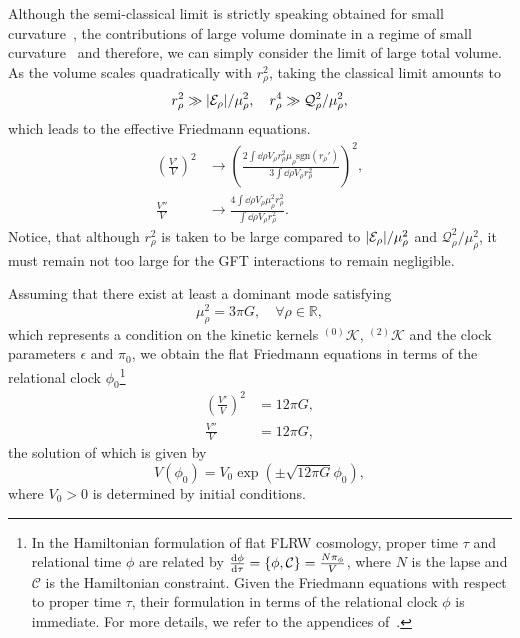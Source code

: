 \documentclass[11pt,a4paper]{article}
\newcommand{\R}{\mathbb R}
\begin{document}
 Although the semi-classical limit is strictly speaking obtained for small curvature~\cite{Oriti:2016qtz,Gielen:2016dss,Ashtekar:2021kfp}, the contributions of large volume dominate in a regime of small curvature~\cite{Oriti:2016qtz} and therefore, we can simply consider the limit of large total volume. As the volume scales quadratically with $r_{\rho}^2$, taking the classical limit amounts to
%
\begin{equation}\label{eq:conditions of classical limit}
r_{\rho}^2 \gg  \abs{\mathcal{E}_{\rho}}/\mu_{\rho}^2,\quad r_{\rho}^4 \gg \mathcal{Q}_{\rho}^2/\mu_{\rho}^2,
\end{equation}
%
which leads to the effective Friedmann equations. 
%
\begin{align}
\left(\frac{V'}{V}\right)^2 & \longrightarrow \left(\frac{2\int\dd{\rho}V_{\rho}r_{\rho}^2\mu_{\rho}\text{sgn}(r_{\rho}')}{3\int\dd{\rho}V_{\rho}r_{\rho}^2}\right)^2,\\[7pt]
\frac{V''}{V} & \longrightarrow \frac{4\int\dd{\rho}V_{\rho}\mu_{\rho}^2r_{\rho}^2}{\int\dd{\rho}V_{\rho}r_{\rho}^2}.
\end{align}
%
Notice, that although $r_{\rho}^2$ is taken to be large compared to $\abs{\mathcal{E}_{\rho}}/\mu_{\rho}^2$ and $\mathcal{Q}_{\rho}^2/\mu_{\rho}^2$, it must remain not too large for the GFT interactions to remain negligible.

Assuming that there exist at least a dominant mode satisfying
%
\begin{equation}\label{eq:emergent G}
\mu_{\rho}^2 = 3\pi G,\quad \forall \rho\in\R,
\end{equation}
%
which represents a condition on the kinetic kernels ${}^{(0)}\mathscr{K}$, ${}^{(2)}\mathscr{K}$ and the clock parameters $\epsilon$ and $\pi_0$, we obtain the flat Friedmann equations in terms of the relational clock $\phi_0$\footnote{In the Hamiltonian formulation of flat FLRW cosmology, proper time $\tau$ and relational time $\phi$ are related by $\dv{\phi}{\tau} = \pb{\phi}{\mathcal{C}} = \frac{N\pi_{\phi}}{V}$, where $N$ is the lapse and $\mathcal{C}$ is the Hamiltonian constraint. Given the Friedmann equations with respect to proper time $\tau$, their formulation in terms of the relational clock $\phi$ is immediate. For more details, we refer to the appendices of~\cite{Oriti:2016qtz,Marchetti:2020umh}.}
%
\begin{align}
\left(\frac{V'}{V}\right)^2 & = 12\pi G,\\[7pt]
\frac{V''}{V} & = 12\pi G,
\end{align}
%
the solution of which is given by
%
\begin{equation}\label{eq:solution of Friedmann equations}
V(\phi_0)
=
V_0 \exp(\pm\sqrt{12\pi G}\phi_0),
\end{equation}
%
where $V_0>0$ is determined by initial conditions. 
\end{document}
